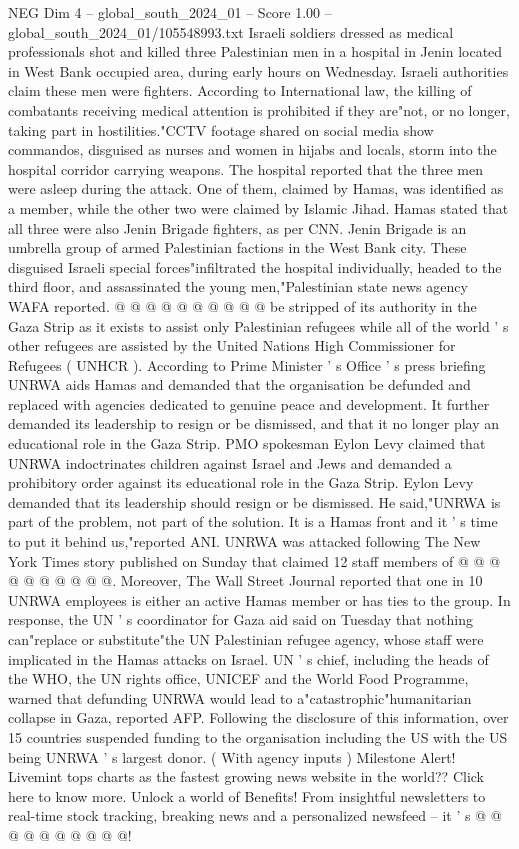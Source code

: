 \begin{textsample}{NEG Dim 4 – global\_south\_2024\_01 – Score 1.00 – global\_south\_2024\_01/105548993.txt}  \label{ex:f4_neg_081}
Israeli soldiers dressed as medical professionals shot and killed three Palestinian men in a hospital in Jenin located in West Bank occupied area, during early hours on Wednesday.
Israeli authorities claim these men were fighters.
According to International law, the killing of combatants receiving medical attention is prohibited if they are"not, or no longer, taking part in hostilities."CCTV footage shared on social media show commandos, disguised as nurses and women in hijabs and locals, storm into the hospital corridor carrying weapons.
The hospital reported that the three men were asleep during the attack.
One of them, claimed by Hamas, was identified as a member, while the other two were claimed by Islamic Jihad.
Hamas stated that all three were also Jenin Brigade fighters, as per CNN.
Jenin Brigade is an umbrella group of armed Palestinian factions in the West Bank city.
These disguised Israeli special forces"infiltrated the hospital individually, headed to the third floor, and assassinated the young men,"Palestinian state news agency WAFA reported. @ @ @ @ @ @ @ @ @ @ be stripped of its authority in the Gaza Strip as it exists to assist only Palestinian refugees while all of the world ' s other refugees are assisted by the United Nations High Commissioner for Refugees ( UNHCR ).
According to Prime Minister ' s Office ' s press briefing UNRWA aids Hamas and demanded that the organisation be defunded and replaced with agencies dedicated to genuine peace and development.
It further demanded its leadership to resign or be dismissed, and that it no longer play an educational role in the Gaza Strip.
PMO spokesman Eylon Levy claimed that UNRWA indoctrinates children against Israel and Jews and demanded a prohibitory order against its educational role in the Gaza Strip.
Eylon Levy demanded that its leadership should resign or be dismissed.
He said,"UNRWA is part of the problem, not part of the solution.
It is a Hamas front and it ' s time to put it behind us,"reported ANI.
UNRWA was attacked following The New York Times story published on Sunday that claimed 12 staff members of @ @ @ @ @ @ @ @ @ @.
Moreover, The Wall Street Journal reported that one in 10 UNRWA employees is either an active Hamas member or has ties to the group.
In response, the UN ' s coordinator for Gaza aid said on Tuesday that nothing can"replace or substitute"the UN Palestinian refugee agency, whose staff were implicated in the Hamas attacks on Israel.
UN ' s chief, including the heads of the WHO, the UN rights office, UNICEF and the World Food Programme, warned that defunding UNRWA would lead to a"catastrophic"humanitarian collapse in Gaza, reported AFP.
Following the disclosure of this information, over 15 countries suspended funding to the organisation including the US with the US being UNRWA ' s largest donor. ( With agency inputs ) Milestone Alert!
Livemint tops charts as the fastest growing news website in the world??
Click here to know more.
Unlock a world of Benefits!
From insightful newsletters to real-time stock tracking, breaking news and a personalized newsfeed -- it ' s @ @ @ @ @ @ @ @ @ @!

\end{textsample}
